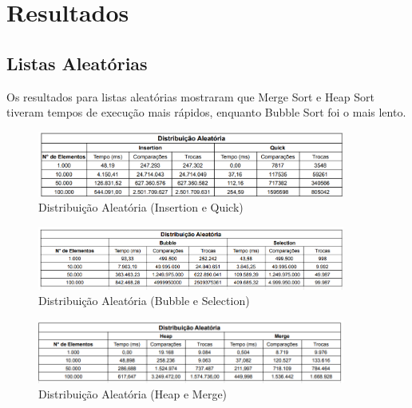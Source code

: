 \documentclass[12pt, a4paper]{report}
\begin{document}
\chapter{Resultados}
\section{Listas Aleatórias}
Os resultados para listas aleatórias mostraram que Merge Sort e Heap Sort tiveram tempos de execução mais rápidos, enquanto Bubble Sort foi o mais lento.

\begin{figure}[H]
    \centering
    \includegraphics[width=0.9\textwidth]{listas/aleatorio1.png}
    \caption{Distribuição Aleatória (Insertion e Quick)}
    \label{fig:aleatorio1}
\end{figure}
\begin{figure}[H]
    \centering
    \includegraphics[width=0.9\textwidth]{listas/aleatorio2.png}
    \caption{Distribuição Aleatória (Bubble e Selection)}
    \label{fig:aleatorio2}
\end{figure}
\begin{figure}[H]
    \centering
    \includegraphics[width=0.9\textwidth]{listas/aleatorio3.png}
    \caption{Distribuição Aleatória (Heap e Merge)}
    \label{fig:aleatorio3}
\end{figure}
\end{document}
